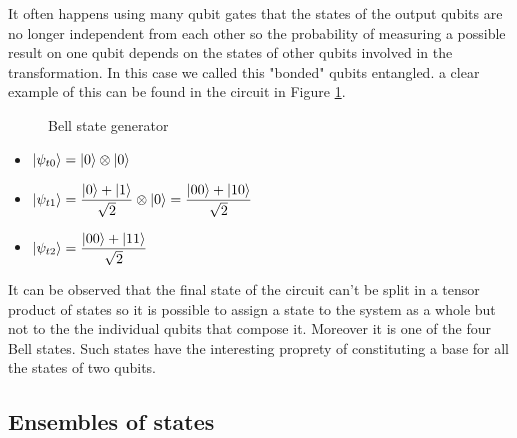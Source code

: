 \documentclass{article}
\begin{document}
It often happens using many qubit gates that the states of the output
qubits are no longer independent from each other so the probability
of measuring a possible result on one qubit depends on the states of
other qubits involved in the transformation.
In this case we called this "bonded" qubits entangled.
a clear example of this can be found in the circuit in Figure \ref{entanglement}.\\

\begin{figure}[H]
	\centering
	\caption{Bell state generator}
	\label{entanglement}
\end{figure}

\begin{itemize}
	\item $\ket{\psi_{t0}} = \ket{0} \otimes \ket{0}$
	\item $\ket{\psi_{t1}} = \dfrac{\ket{0}+\ket{1}}{\sqrt{2}} \otimes \ket{0} = \dfrac{\ket{00}+\ket{10}}{\sqrt{2}}$
	\item $\ket{\psi_{t2}} = \dfrac{\ket{00}+\ket{11}}{\sqrt{2}}$

\end{itemize}
It can be observed that the final state of the circuit can't be split
in a tensor product of states so it is possible to assign a state to
the system as a whole but not to the the individual qubits that compose it.
Moreover it is one of the four Bell states.
Such states have the interesting proprety of constituting a base for all
the states of two qubits.



\subsection{Ensembles of states}
\end{document}
